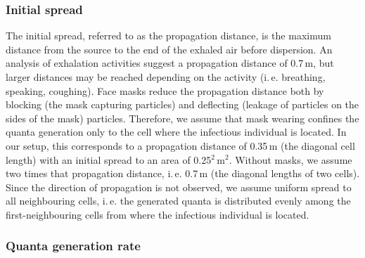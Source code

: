 \documentclass[fleqn,11pt]{wlscirep_supp}
\newcommand\ie{i.\,e.\xspace}
\begin{document}
\subsubsection{Initial spread}

The initial spread, referred to as the propagation distance, is the maximum distance from the source to the end of the exhaled air before dispersion. An analysis of exhalation activities suggest a propagation distance of 0.7\,m\cite{Tang2013PLoSOne}, but larger distances may be reached depending on the activity (\ie breathing, speaking, coughing). Face masks reduce the propagation distance both by blocking (the mask capturing particles) and deflecting (leakage of particles on the sides of the mask) particles\cite{Tang2009RoyalInt,Hui2012PLoSOne,Mansour2013AerosolMed}. Therefore, we assume that mask wearing confines the quanta generation only to the cell where the infectious individual is located. In our setup, this corresponds to a propagation distance of 0.35\,m (the diagonal cell length) with an initial spread to an area of 0.25$^2$\,m$^2$. Without masks, we assume two times that propagation distance, \ie 0.7\,m (the diagonal lengths of two cells)\cite{Tang2013PLoSOne}. Since the direction of propagation is not observed, we assume uniform spread to all neighbouring cells, \ie the generated quanta is distributed evenly among the first-neighbouring cells from where the infectious individual is located.


\subsubsection{Quanta generation rate}
\end{document}
